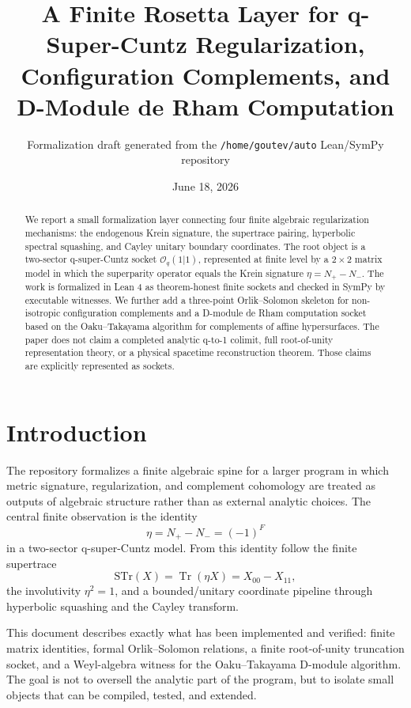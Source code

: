 \documentclass[11pt]{article}
\title{A Finite Rosetta Layer for q-Super-Cuntz Regularization,\\
Configuration Complements, and D-Module de Rham Computation}
\author{Formalization draft generated from the \texttt{/home/goutev/auto} Lean/SymPy repository}
\date{June 18, 2026}
\newcommand{\On}{\mathcal{O}}
\newcommand{\STr}{\mathrm{STr}}
\begin{document}
\maketitle

\begin{abstract}
We report a small formalization layer connecting four finite algebraic
regularization mechanisms: the endogenous Krein signature, the supertrace
pairing, hyperbolic spectral squashing, and Cayley unitary boundary
coordinates.  The root object is a two-sector q-super-Cuntz socket
\(\On_q(1|1)\), represented at finite level by a \(2\times2\) matrix model in
which the superparity operator equals the Krein signature
\(\eta=N_+-N_-\).  The work is formalized in Lean 4 as theorem-honest finite
sockets and checked in SymPy by executable witnesses.  We further add a
three-point Orlik--Solomon skeleton for non-isotropic configuration
complements and a D-module de Rham computation socket based on the
Oaku--Takayama algorithm for complements of affine hypersurfaces.  The paper
does not claim a completed analytic q-to-1 colimit, full root-of-unity
representation theory, or a physical spacetime reconstruction theorem.  Those
claims are explicitly represented as sockets.
\end{abstract}

\section{Introduction}

The repository formalizes a finite algebraic spine for a larger program in
which metric signature, regularization, and complement cohomology are treated
as outputs of algebraic structure rather than as external analytic choices.
The central finite observation is the identity
\[
  \eta = N_+ - N_- = (-1)^F
\]
in a two-sector q-super-Cuntz model.  From this identity follow the finite
supertrace
\[
  \STr(X)=\operatorname{Tr}(\eta X)=X_{00}-X_{11},
\]
the involutivity \(\eta^2=1\), and a bounded/unitary coordinate pipeline
through hyperbolic squashing and the Cayley transform.

This document describes exactly what has been implemented and verified:
finite matrix identities, formal Orlik--Solomon relations, a finite
root-of-unity truncation socket, and a Weyl-algebra witness for the
Oaku--Takayama D-module algorithm.  The goal is not to oversell the analytic
part of the program, but to isolate small objects that can be compiled,
tested, and extended.
\end{document}
